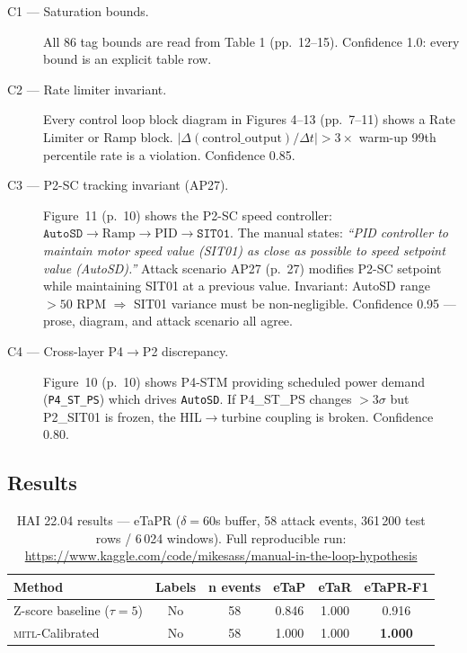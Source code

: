 \documentclass[sigconf,anonymous,review]{acmart}
\newcommand{\mitl}{\textsc{mitl}\xspace}
\begin{document}
\begin{description}
  \item[C1 — Saturation bounds.] All 86 tag bounds are read from Table 1
    (pp.~12--15).  Confidence 1.0: every bound is an explicit table row.

  \item[C2 — Rate limiter invariant.] Every control loop block diagram in
    Figures 4--13 (pp.~7--11) shows a Rate Limiter or Ramp block.
    $|\Delta(\text{control\_output}) / \Delta t| > 3\times$ warm-up 99th
    percentile rate is a violation.  Confidence 0.85.

  \item[C3 — P2-SC tracking invariant (AP27).] Figure~11 (p.~10) shows the
    P2-SC speed controller: $\texttt{AutoSD} \to \text{Ramp} \to \text{PID}
    \to \texttt{SIT01}$.  The manual states: \emph{``PID controller to
    maintain motor speed value (SIT01) as close as possible to speed setpoint
    value (AutoSD).''} Attack scenario AP27 (p.~27) modifies P2-SC setpoint
    while maintaining SIT01 at a previous value.  Invariant: AutoSD range $>
    50$ RPM $\Rightarrow$ SIT01 variance must be non-negligible.
    Confidence 0.95 — prose, diagram, and attack scenario all agree.

  \item[C4 — Cross-layer P4$\to$P2 discrepancy.] Figure~10 (p.~10) shows
    P4-STM providing scheduled power demand (\texttt{P4\_ST\_PS}) which drives
    \texttt{AutoSD}.  If P4\_ST\_PS changes $> 3\sigma$ but P2\_SIT01 is
    frozen, the HIL$\to$turbine coupling is broken.  Confidence 0.80.
\end{description}

\subsection{Results}

\begin{table}[h]
\centering
\caption{HAI 22.04 results — eTaPR ($\delta = 60$s buffer, 58 attack events,
  361\,200 test rows / 6\,024 windows).
  Full reproducible run: \url{https://www.kaggle.com/code/mikesass/manual-in-the-loop-hypothesis}}
\label{tab:hai}
\begin{tabular}{lccccc}
\toprule
Method & Labels & n events & eTaP & eTaR & eTaPR-F1 \\
\midrule
Z-score baseline ($\tau=5$) & No & 58 & 0.846 & 1.000 & 0.916 \\
\mitl-Calibrated            & No & 58 & 1.000 & 1.000 & \textbf{1.000} \\
\bottomrule
\end{tabular}
\end{table}
\end{document}
